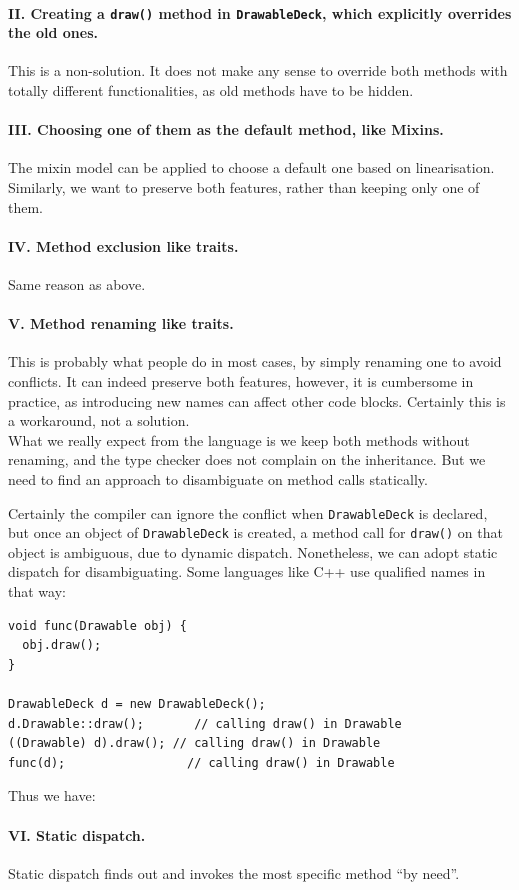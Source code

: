 \paragraph{II. Creating a \lstinline|draw()| method in \lstinline|DrawableDeck|, which explicitly overrides the old ones.}
This is a non-solution. It does not make any sense to override both methods with totally different functionalities, as old
methods have to be hidden.

\paragraph{III. Choosing one of them as the default method, like Mixins.} The mixin model can be applied to choose a
default one based on linearisation. Similarly, we want to preserve both features, rather than keeping only one of them.

\paragraph{IV. Method exclusion like traits.} Same reason as above.

\paragraph{V. Method renaming like traits.} This is probably what people do in most cases, by simply renaming one to avoid conflicts.
It can indeed preserve both features, however, it is cumbersome in practice, as introducing new names can affect other code blocks.
Certainly this is a workaround, not a solution.\\

What we really expect from the language is we keep both methods without renaming, and the type checker does not complain on the
inheritance. But we need to find an approach to disambiguate on method calls statically.

Certainly the compiler can ignore the conflict when \lstinline|DrawableDeck| is declared, but once an object of \lstinline|DrawableDeck| is created, a method call for \lstinline|draw()| on that object is ambiguous, due to dynamic dispatch. Nonetheless, we can adopt static dispatch for disambiguating. Some languages like C++ use qualified names in that way:

\vspace{3pt}\begin{lstlisting}
void func(Drawable obj) {
  obj.draw();
}

DrawableDeck d = new DrawableDeck();
d.Drawable::draw();       // calling draw() in Drawable
((Drawable) d).draw(); // calling draw() in Drawable
func(d);                 // calling draw() in Drawable
\end{lstlisting}\vspace{3pt}
Thus we have: \paragraph{VI. Static dispatch.} Static dispatch finds out and invokes the most specific method ``by need''.

